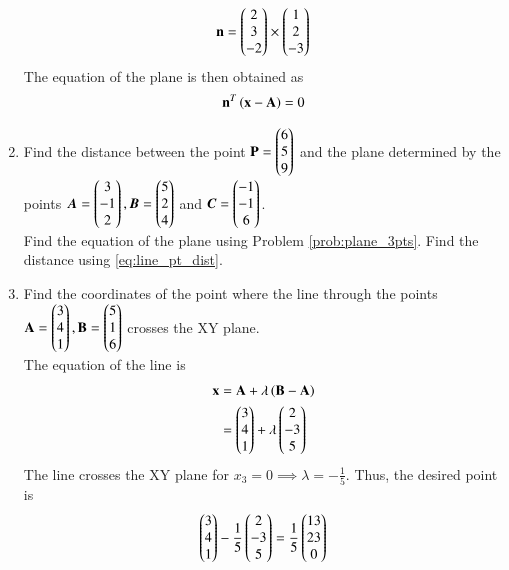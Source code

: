 \begin{enumerate}[label=\arabic*.,ref=\thesubsection.\theenumi]
%
\begin{align}
\mathbf{n} = \begin{pmatrix}2 \\ 3 \\ -2\end{pmatrix} \times \begin{pmatrix}1 \\ 2 \\ -3\end{pmatrix}
\end{align}
%
The equation of the plane is then obtained as
%
\begin{align}
\mathbf{n}^T\left(\mathbf{x}-\mathbf{A}\right) = 0
\end{align}
%
\item Find the distance between the point $\mathbf{P}=\begin{pmatrix}6\\5\\9\end{pmatrix}$ and the plane determined by the points $\bm{A}=\begin{pmatrix}3\\-1\\2\end{pmatrix}, \bm{B}=\begin{pmatrix}5\\2\\4\end{pmatrix}$ and $\bm{C}=\begin{pmatrix}-1\\-1\\6\end{pmatrix}$.
%
\\
\solution Find the equation of the plane using Problem \ref{prob:plane_3pts}.  Find the distance using \eqref{eq:line_pt_dist}.
%
\item Find the coordinates of the point where the line through the points
$
\mathbf{A}=\begin{pmatrix}3\\4\\1\end{pmatrix}, 
\mathbf{B}=\begin{pmatrix}5\\1\\6\end{pmatrix}
$
crosses the XY plane.
%
\\
\solution The equation of the line is 
%
\begin{align}
\mathbf{x} &= \mathbf{A}+\lambda\left(\mathbf{B}-\mathbf{A}\right)
\\
&= \begin{pmatrix}3\\4\\1\end{pmatrix} + \lambda \begin{pmatrix}2\\-3\\5\end{pmatrix}
\end{align}
%
The line  crosses the XY plane for $x_3 = 0 \implies \lambda = -\frac{1}{5}$. Thus, the desired point is
%
\begin{align}
 \begin{pmatrix}3\\4\\1\end{pmatrix} -\frac{1}{5}\begin{pmatrix}2\\-3\\5\end{pmatrix} = \frac{1}{5}\begin{pmatrix}13\\23\\0\end{pmatrix}
\end{align}

\end{enumerate}
